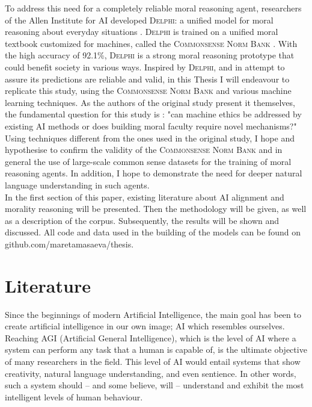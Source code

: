 \documentclass[final]{clv3} %
\begin{document}
To address this need for a completely reliable moral reasoning agent, researchers of the Allen Institute for AI developed \textsc{Delphi}: a unified model for moral reasoning about everyday situations \cite{jiang}. \textsc{Delphi} is trained on a unified moral textbook customized for machines, called the \textsc{Commonsense Norm Bank} \cite{jiang}. With the high accuracy of 92.1\%, \textsc{Delphi} is a strong moral reasoning prototype that could benefit society in various ways. Inspired by \textsc{Delphi}, and in attempt to assure its predictions are reliable and valid, in this Thesis I will endeavour to replicate this study, using the \textsc{Commonsense Norm Bank} and various machine learning techniques. As the authors of the original study present it themselves, the fundamental question for this study is : "can machine ethics be addressed by existing AI methods or does building moral faculty require novel mechanisms?" \cite[p. 2]{jiang}  Using techniques different from the ones used in the original study, I hope and hypothesise to confirm the validity of the \textsc{Commonsense Norm Bank} and in general the use of large-scale common sense datasets for the training of moral reasoning agents. In addition, I hope to demonstrate the need for deeper natural language understanding in such agents.\\

In the first section of this paper, existing literature about AI alignment and morality reasoning will be presented. Then the methodology will be given, as well as a description of the corpus. Subsequently, the results will be shown and discussed. All code and data used in the building of the models can be found on github.com/maretamasaeva/thesis.

\section{Literature}
Since the beginnings of modern Artificial Intelligence, the main goal has been to create artificial intelligence in our own image; AI which resembles ourselves.  Reaching AGI (Artificial General Intelligence), which is the level of AI where a system can perform any task that a human is capable of, is the ultimate objective of many researchers in the field. This level of AI would entail systems that show creativity, natural language understanding, and even sentience. In other words, such a system should – and some believe, will – understand and exhibit the most intelligent levels of human behaviour. \\
\end{document}
